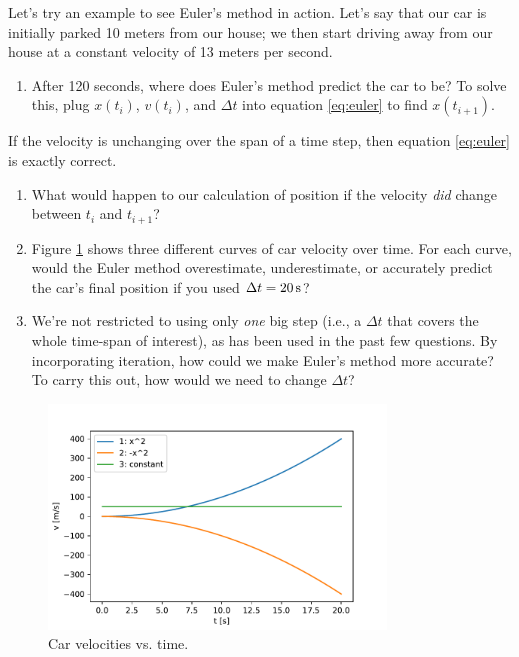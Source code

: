 \documentclass[11pt]{article}
\begin{document}
\medskip \noindent
Let's try an example to see Euler's method in action. Let's say that our car is initially parked 10 meters from our house; we then start driving away from our house at a constant velocity of 13 meters per second.

\begin{enumerate}[resume]
    \item After 120 seconds, where does Euler's method predict the car to be? To solve this, plug $x(t_i)$, $v(t_i)$, and $\Delta t$ into equation \ref{eq:euler} to find $x(t_{i+1})$.
\end{enumerate}

\medskip \noindent
If the velocity is unchanging over the span of a time step, then equation \ref{eq:euler} is exactly correct.
\begin{enumerate}[resume]
    \item What would happen to our calculation of position if the velocity \textit{did} change between $t_i$ and $t_{i+1}$? 
    
    \item Figure \ref{fig:three_functions} shows three different curves of car velocity over time. For each curve, would the Euler method overestimate, underestimate, or accurately predict the car's final position if you used $\Delta t = 20 \, {\rm s}$?
    
    \item We're not restricted to using only \emph{one} big step (i.e., a $\Delta t$ that covers the whole time-span of interest), as has been used in the past few questions. By incorporating iteration, how could we make Euler's method more accurate? To carry this out, how would we need to change $\Delta t$?
\end{enumerate}

\begin{figure}[t!]
    \centering
    \includegraphics[width=0.8\textwidth]{three_functions.pdf}
    \caption{Car velocities vs. time.}
    \label{fig:three_functions}
\end{figure}
\end{document}

